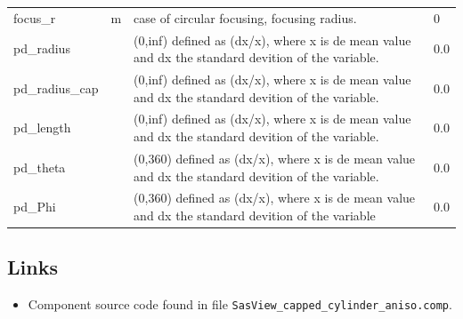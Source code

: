 \begin{longtable}{p{}p{}p{}p{}}
focus\_r & m & case of circular focusing, focusing radius. & 0 \\
pd\_radius &  & (0,inf) defined as (dx/x), where x is de mean value and dx the standard devition of the variable. & 0.0 \\
pd\_radius\_cap &  & (0,inf) defined as (dx/x), where x is de mean value and dx the standard devition of the variable. & 0.0 \\
pd\_length &  & (0,inf) defined as (dx/x), where x is de mean value and dx the standard devition of the variable. & 0.0 \\
pd\_theta &  & (0,360) defined as (dx/x), where x is de mean value and dx the standard devition of the variable. & 0.0 \\
pd\_Phi &  & (0,360) defined as (dx/x), where x is de mean value and dx the standard devition of the variable & 0.0 \\
\bottomrule
\end{longtable}

\subsection*{Links}
\begin{itemize}
  \item Component source code found in file \texttt{SasView\_capped\_cylinder\_aniso.comp}.
\end{itemize}
